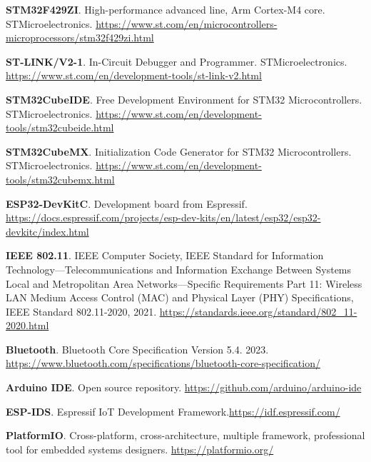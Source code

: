 \begin{thebibliography}{30}
\textbf{STM32F429ZI}. High-performance advanced line, Arm Cortex-M4 core. STMicroelectronics. \href{https://www.st.com/en/microcontrollers-microprocessors/stm32f429zi.html}{https://www.st.com/en/microcontrollers-microprocessors/stm32f429zi.html} 

\textbf{ST-LINK/V2-1}. In-Circuit Debugger and Programmer. STMicroelectronics.
\href{https://www.st.com/en/development-tools/st-link-v2.html}{https://www.st.com/en/development-tools/st-link-v2.html}

\textbf{STM32CubeIDE}. Free Development Environment for STM32 Microcontrollers. STMicroelectronics.
\href{https://www.st.com/en/development-tools/stm32cubeide.html}{https://www.st.com/en/development-tools/stm32cubeide.html}

\textbf{STM32CubeMX}. Initialization Code Generator for STM32 Microcontrollers. STMicroelectronics.
\href{https://www.st.com/en/development-tools/stm32cubemx.html}{https://www.st.com/en/development-tools/stm32cubemx.html}

\textbf{ESP32-DevKitC}. Development board from Espressif.  \href{https://docs.espressif.com/projects/esp-dev-kits/en/latest/esp32/esp32-devkitc/index.html}{https://docs.espressif.com/projects/esp-dev-kits/en/latest/esp32/esp32-devkitc/index.html} 

\textbf{IEEE 802.11}. IEEE Computer Society, IEEE Standard for Information Technology—Telecommunications and Information Exchange Between Systems Local and Metropolitan Area Networks—Specific Requirements Part 11: Wireless LAN Medium Access Control (MAC) and Physical Layer (PHY) Specifications, IEEE Standard 802.11-2020, 2021. \href{https://standards.ieee.org/standard/802_11-2020.html}{https://standards.ieee.org/standard/802\_11-2020.html}


\textbf{Bluetooth}. Bluetooth Core Specification Version 5.4. 2023. \href{https://www.bluetooth.com/specifications/bluetooth-core-specification/}{https://www.bluetooth.com/specifications/bluetooth-core-specification/}

\textbf{Arduino IDE}. Open source repository.  \href{https://github.com/arduino/arduino-ide}{https://github.com/arduino/arduino-ide}


\textbf{ESP-IDS}. Espressif IoT Development Framework.\href{https://idf.espressif.com/}{https://idf.espressif.com/}

\textbf{PlatformIO}. Cross-platform, cross-architecture, multiple framework, professional tool for embedded systems designers. \href{https://platformio.org/}{https://platformio.org/}



\end{thebibliography}
